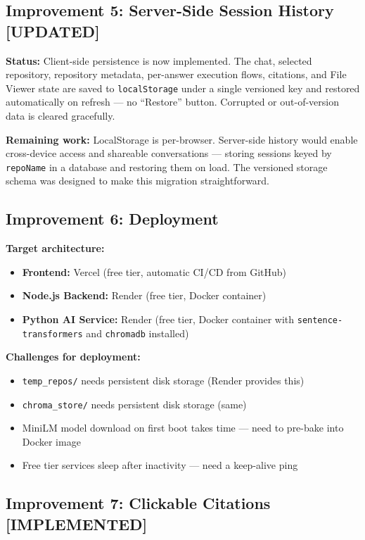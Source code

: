 \documentclass[a4paper,11pt]{article}
\begin{document}
\subsection{Improvement 5: Server-Side Session History \textbf{[UPDATED]}}

\textbf{Status:} Client-side persistence is now implemented. The chat, selected repository, repository metadata, per-answer execution flows, citations, and File Viewer state are saved to \texttt{localStorage} under a single versioned key and restored automatically on refresh --- no ``Restore'' button. Corrupted or out-of-version data is cleared gracefully.

\textbf{Remaining work:} LocalStorage is per-browser. Server-side history would enable cross-device access and shareable conversations --- storing sessions keyed by \texttt{repoName} in a database and restoring them on load. The versioned storage schema was designed to make this migration straightforward.

\subsection{Improvement 6: Deployment}

\textbf{Target architecture:}
\begin{itemize}
    \item \textbf{Frontend:} Vercel (free tier, automatic CI/CD from GitHub)
    \item \textbf{Node.js Backend:} Render (free tier, Docker container)
    \item \textbf{Python AI Service:} Render (free tier, Docker container with \texttt{sentence-transformers} and \texttt{chromadb} installed)
\end{itemize}

\textbf{Challenges for deployment:}
\begin{itemize}
    \item \texttt{temp\_repos/} needs persistent disk storage (Render provides this)
    \item \texttt{chroma\_store/} needs persistent disk storage (same)
    \item MiniLM model download on first boot takes time --- need to pre-bake into Docker image
    \item Free tier services sleep after inactivity --- need a keep-alive ping
\end{itemize}

\subsection{Improvement 7: Clickable Citations \textbf{[IMPLEMENTED]}}
\end{document}
